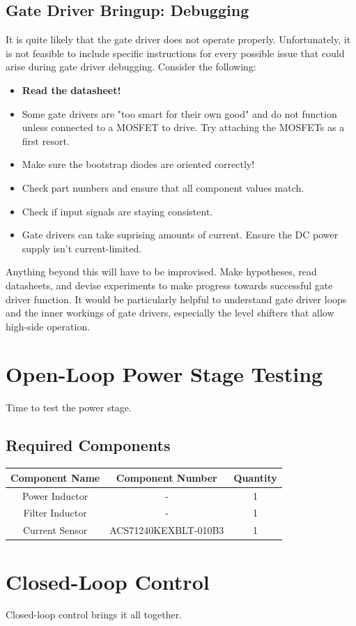 \documentclass[]{report}
\begin{document}
\section{Gate Driver Bringup: Debugging}
It is quite likely that the gate driver does not operate properly. Unfortunately, it is not feasible to include specific instructions for every possible issue that could arise during gate driver debugging. Consider the following: 
\begin{itemize}
	\item \textbf{Read the datasheet!}
	\item Some gate drivers are "too smart for their own good" and do not function unless connected to a MOSFET to drive. Try attaching the MOSFETs as a first resort. 
	\item Make sure the bootstrap diodes are oriented correctly!
	\item Check part numbers and ensure that all component values match. 
	\item Check if input signals are staying consistent. 
	\item Gate drivers can take suprising amounts of current. Ensure the DC power supply isn't current-limited. 
\end{itemize}
Anything beyond this will have to be improvised. Make hypotheses, read datasheets, and devise experiments to make progress towards successful gate driver function. It would be particularly helpful to understand gate driver loops and the inner workings of gate drivers, especially the level shifters that allow high-side operation. 
\chapter{Open-Loop Power Stage Testing}
Time to test the power stage. 
\section{Required Components}
\begin{tabular}{|c|c|c|}
	\hline
	Component Name & Component Number & Quantity \\
	\hline
	Power Inductor & - & 1 \\
	\hline
	Filter Inductor & - & 1 \\
	\hline
	Current Sensor & ACS71240KEXBLT-010B3  & 1 \\
	\hline
\end{tabular}
\chapter{Closed-Loop Control}
Closed-loop control brings it all together. 
\vspace{1cm}


\end{document}
